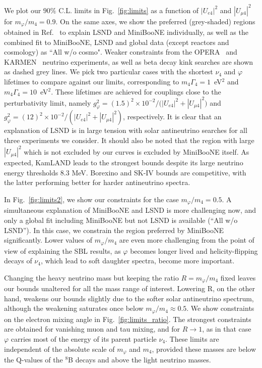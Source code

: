 \documentclass[
reprint,
superscriptaddress,
showpacs,
preprintnumbers,
nofootinbib,
nobibnotes,
amsmath,
amssymb, 
aps,
prd,
floatfix
]{revtex4-1}
\newcommand{\reffig}[1]{Fig.~\ref{#1}}
\renewcommand{\phi}{\varphi}
\begin{document}
We plot our $90\%$ C.L. limits in \reffig{fig:limits} as a function of $|U_{e4}|^2$ and $|U_{\mu4}|^2$ for $m_\phi/m_4=0.9$. On the same axes, we show the preferred (grey-shaded) regions obtained in Ref.~\cite{Dentler:2019dhz} to explain LSND and MiniBooNE individually, as well as the combined fit to MiniBooNE, LSND and global data (except reactors and cosmology) as ``All w/o cosmo". Weaker constraints from the OPERA~\cite{Agafonova:2013xsk} and KARMEN~\cite{Armbruster:2002mp} neutrino experiments, as well as beta decay kink searches are shown as dashed grey lines.
We pick two particular cases with the shortest $\nu_4$ and $\phi$ lifetimes to compare against our limits, corresponding to $m_4 \Gamma_4= 1$~eV$^2$  and $m_4\Gamma_4=10$~eV$^2$. These lifetimes are achieved for couplings close to the perturbativity limit, namely $g_\phi^2 = (1.5)^2 \times 10^{-2}/({|U_{e4}|^2+|U_{\mu4}|^2)} $ and $g_\phi^2 =  (12)^2 \times 10^{-2}/{(|U_{e4}|^2+|U_{\mu4}|^2)}$, respectively. It is clear that an explanation of LSND is in large tension with solar antineutrino searches for all three experiments we consider. It should also be noted that the region with large $|U_{\mu4}|^2$ which is not excluded by our curves is excluded by MiniBooNE itself. As expected, KamLAND leads to the strongest bounds despite its large neutrino energy thresholds $8.3$ MeV. Borexino and SK-IV bounds are competitive, with the latter performing better for harder antineutrino spectra.

In \reffig{fig:limits2}, we show our constraints for the case $m_\phi/m_4=0.5$. A simultaneous explanation of MiniBooNE and LSND is more challenging now, and only a global fit including MiniBooNE but not LSND is available (``All w/o LSND''). In this case, we constrain the region preferred by MiniBooNE significantly. Lower values of $m_\phi/m_4$ are even more challenging from the point of view of explaining the SBL results, as $\phi$ becomes longer lived and helicity-flipping decays of $\nu_4$, which lead to soft daughter spectra, become more important.


Changing the heavy neutrino mass but keeping the ratio $R = m_\phi/m_4$ fixed leaves our bounds unaltered for all the mass range of interest. Lowering R, on the other hand, weakens our bounds slightly due to the softer solar antineutrino spectrum, although the weakening saturates once below $m_\phi/m_4 \approx 0.5$. We show constraints on the electron mixing angle in \reffig{fig:limits_ratio}. The strongest constraints are obtained for vanishing muon and tau mixing, and for $R\to1$, as in that case $\phi$ carries most of the energy of its parent particle $\nu_4$. These limits are independent of the absolute scale of $m_\phi$ and $m_4$, provided these masses are below the Q-values of the $^8$B decays and above the light neutrino masses.
\end{document}
